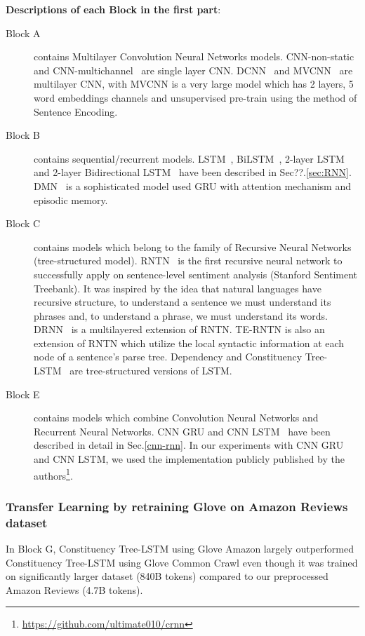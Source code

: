 \textbf{Descriptions of each Block in the first part}:
\begin{description}
	\item[Block A] contains Multilayer Convolution Neural Networks models.
	CNN-non-static and CNN-multichannel~\cite{KimCNN} are single layer CNN.
	DCNN~\cite{DCNN} and MVCNN~\cite{2-layer-cnn} are multilayer CNN, with MVCNN is a very large model  which has 2 layers, 5 word embeddings channels and unsupervised pre-train using the method of Sentence Encoding.
	\item[Block B] contains sequential/recurrent models.
	LSTM~\cite{originLSTM}, BiLSTM~\cite{GravesLSTM}, 2-layer LSTM~\cite{GravesLSTM} and 2-layer Bidirectional LSTM~\cite{GravesLSTM} have been described in Sec??.\ref{sec:RNN}.
	DMN~\cite{attention-gru} is a sophisticated model used GRU with attention mechanism and episodic memory.
	\item[Block C] contains models which belong to the family of Recursive Neural Networks (tree-structured model).
	RNTN~\cite{socher2013recursive} is the first recursive neural network to successfully apply on sentence-level sentiment analysis (Stanford Sentiment Treebank).
	It was inspired by the idea that natural languages have recursive structure, to understand a sentence we must understand its phrases and, to understand a phrase, we must understand its words.
	DRNN~\cite{IrsoyDRNN} is a multilayered extension of RNTN.
	TE-RNTN is also an extension of RNTN which utilize the local syntactic information at each node of a sentence's parse tree.
	Dependency and Constituency Tree-LSTM~\cite{treeLSTM} are tree-structured versions of LSTM.
	
	\item[Block E] contains models which combine Convolution Neural Networks and Recurrent Neural Networks.
	CNN GRU and CNN LSTM~\cite{cnn-rnn} have been described in detail in Sec.\ref{cnn-rnn}.
	In our experiments with CNN GRU and CNN LSTM, we used the implementation publicly published by the authors\footnote{\url{https://github.com/ultimate010/crnn}}.
\end{description}
\subsubsection{Transfer Learning by retraining Glove on Amazon Reviews dataset}
\label{fact:glove-amazon-improve-tree}
In Block G, Constituency Tree-LSTM using Glove Amazon largely outperformed Constituency Tree-LSTM using Glove Common Crawl even though it was trained on significantly larger dataset (840B tokens) compared to our preprocessed Amazon Reviews (4.7B tokens).

